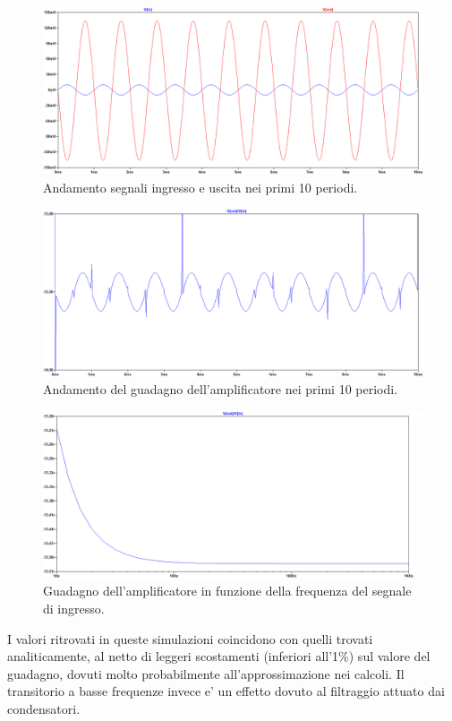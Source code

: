 \documentclass[a4paper,10pt]{article}
\begin{document}
\begin{figure}[h!]
  	\centering
 	\includegraphics[width=0.7\linewidth]{es2-1-5-1.png}
  	\caption{Andamento segnali ingresso e uscita nei primi 10 periodi.}
  	\label{fig:inout1}
\end{figure}
\begin{figure}[h!]
  	\centering
 	\includegraphics[width=0.7\linewidth]{es2-1-5bis.png}
  	\caption{Andamento del guadagno dell'amplificatore nei primi 10 periodi.}
  	\label{fig:gain10}
\end{figure}
\begin{figure}[h!]
  	\centering
 	\includegraphics[width=0.7\linewidth]{es2-1-5.png}
  	\caption{Guadagno dell'amplificatore in funzione della frequenza del segnale di ingresso.}
  	\label{fig:gainfreq}
\end{figure}
I valori ritrovati in queste simulazioni coincidono con quelli trovati analiticamente, al netto di leggeri scostamenti (inferiori all'1\%) sul valore del guadagno, dovuti molto probabilmente all'approssimazione nei calcoli. Il transitorio a basse frequenze invece e' un effetto dovuto al filtraggio attuato dai condensatori.
\newpage
\end{document}

